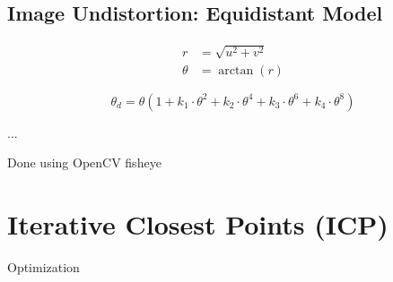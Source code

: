\subsection{Image Undistortion: Equidistant Model}
\label{sec:undistortion}

\begin{align}
    r &= \sqrt{u^2 + v^2} \\
    \theta &= \arctan(r)
\end{align}

\begin{equation}
    \theta_d = \theta (1+ k_1\cdot\theta^2 + k_2\cdot\theta^4 + k_3\cdot\theta^6 + k_4\cdot\theta^8)
\end{equation}

...

Done using OpenCV fisheye

\section{Iterative Closest Points (ICP)}
\label{sec:iterative_closest_points}

Optimization
